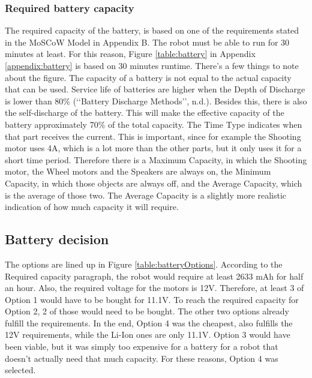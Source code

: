 \documentclass[11pt,twoside,a4paper]{report}
\begin{document}
\subsubsection{Required battery capacity}
The required capacity of the battery, is based on one of the requirements stated in the MoSCoW Model in Appendix B. The robot must be able to run for 30 minutes at least. For this reason, Figure \ref{table:battery} in Appendix \ref{appendix:battery} is based on 30 minutes runtime. 
There\rq{}s a few things to note about the figure. The capacity of a battery is not equal to the actual capacity that can be used. Service life of batteries are higher when the Depth of Discharge is lower than 80\% (\lq\lq{}Battery Discharge Methods\rq\rq{}, n.d.). Besides this, there is also the self-discharge of the battery. This will make the effective capacity of the battery approximately 70\% of the total capacity. 
The Time Type indicates when that part receives the current. This is important, since for example the Shooting motor uses 4A, which is a lot more than the other parts, but it only uses it for a short time period. Therefore there is a Maximum Capacity, in which the Shooting motor, the Wheel motors and the Speakers are always on, the Minimum Capacity, in which those objects are always off, and the Average Capacity, which is the average of those two. The Average Capacity is a slightly more realistic indication of how much capacity it will require. 

\subsection{Battery decision}
The options are lined up in Figure \ref{table:batteryOptions}. According to the Required capacity paragraph, the robot would require at least 2633 mAh for half an hour. Also, the required voltage for the motors is 12V. Therefore, at least 3 of Option 1 would have to be bought for 11.1V. To reach the required capacity for Option 2, 2 of those would need to be bought. The other two options already fulfill the requirements. 
In the end, Option 4 was the cheapest, also fulfills the 12V requirements, while the Li-Ion ones are only 11.1V. Option 3 would have been viable, but it was simply too expensive for a battery for a robot that doesn\rq{}t actually need that much capacity. 
For these reasons, Option 4 was selected. 
\end{document}
